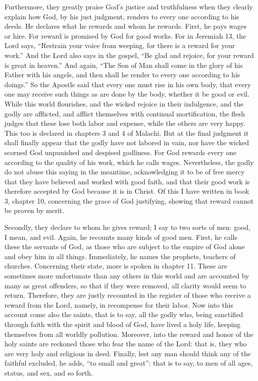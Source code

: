 Furthermore, they greatly praise God’s justice and truthfulness when they clearly explain how God, by his just judgment, renders to every one according to his deeds. He declares what he rewards and whom he rewards. First, he pays wages or hire. For reward is promised by God for good works. For in Jeremiah 13, the Lord says, “Restrain your voice from weeping, for there is a reward for your work.” And the Lord also says in the gospel, “Be glad and rejoice, for your reward is great in heaven.” And again, “The Son of Man shall come in the glory of his Father with his angels, and then shall he render to every one according to his doings.” So the Apostle said that every one must rise in his own body, that every one may receive such things as are done by the body, whether it be good or evil. While this world flourishes, and the wicked rejoice in their indulgence, and the godly are afflicted, and afflict themselves with continual mortification, the flesh judges that these lose both labor and expense, while the others are very happy. This too is declared in chapters 3 and 4 of Malachi. But at the final judgment it shall finally appear that the godly have not labored in vain, nor have the wicked scorned God unpunished and despised godliness. For God rewards every one according to the quality of his work, which he calls wages. Nevertheless, the godly do not abuse this saying in the meantime, acknowledging it to be of free mercy that they have believed and worked with good faith, and that their good work is therefore accepted by God because it is in Christ. Of this I have written in book 3, chapter 10, concerning the grace of God justifying, showing that reward cannot be proven by merit.

Secondly, they declare to whom he gives reward; I say to two sorts of men: good, I mean, and evil. Again, he recounts many kinds of good men. First, he calls these the servants of God, as those who are subject to the empire of God alone and obey him in all things. Immediately, he names the prophets, teachers of churches. Concerning their state, more is spoken in chapter 11. These are sometimes more unfortunate than any others in this world and are accounted by many as great offenders, so that if they were removed, all clarity would seem to return. Therefore, they are justly recounted in the register of those who receive a reward from the Lord, namely, in recompense for their labor. Now into this account come also the saints, that is to say, all the godly who, being sanctified through faith with the spirit and blood of God, have lived a holy life, keeping themselves from all worldly pollution. Moreover, into the reward and honor of the holy saints are reckoned those who fear the name of the Lord: that is, they who are very holy and religious in deed. Finally, lest any man should think any of the faithful excluded, he adds, “to small and great”: that is to say, to men of all ages, status, and sex, and so forth.

